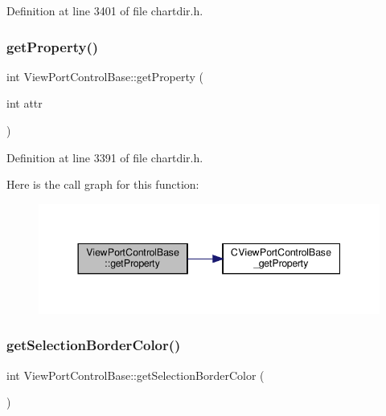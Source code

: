 Definition at line 3401 of file chartdir.\+h.

\mbox{\label{class_view_port_control_base_adbb7131d58df8d9f3e592f1ec082edf7}} 
\subsubsection{\texorpdfstring{get\+Property()}{getProperty()}}
{\footnotesize\ttfamily int View\+Port\+Control\+Base\+::get\+Property (\begin{DoxyParamCaption}\item[{int}]{attr }\end{DoxyParamCaption})\hspace{0.3cm}{\ttfamily [inline]}}



Definition at line 3391 of file chartdir.\+h.

Here is the call graph for this function\+:
\nopagebreak
\begin{figure}[H]
\begin{center}
\leavevmode
\includegraphics[width=344pt]{class_view_port_control_base_adbb7131d58df8d9f3e592f1ec082edf7_cgraph}
\end{center}
\end{figure}
\mbox{\label{class_view_port_control_base_a860df7a275bd13df2c16938705b13a8b}} 
\subsubsection{\texorpdfstring{get\+Selection\+Border\+Color()}{getSelectionBorderColor()}}
{\footnotesize\ttfamily int View\+Port\+Control\+Base\+::get\+Selection\+Border\+Color (\begin{DoxyParamCaption}{ }\end{DoxyParamCaption})\hspace{0.3cm}{\ttfamily [inline]}}



